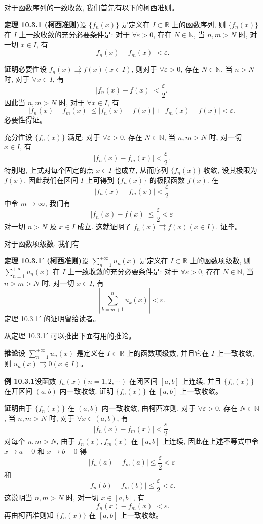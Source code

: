 \documentclass[UTF8,12pt,a4paper,fontset=fandol]{ctexart}
\begin{document}
对于函数序列的一致收敛, 我们首先有以下的柯西准则。

\noindent\textbf{定理 10.3.1 (柯西准则)}\quad 设 $\{f_n(x)\}$ 是定义在 $I\subset\mathbb R$ 上的函数序列, 则 $\{f_n(x)\}$ 在 $I$ 上一致收敛的充分必要条件是: 对于 $\forall\varepsilon>0$, 存在 $N\in\mathbb N$, 当 $n,m>N$ 时, 对一切 $x\in I$, 有
\[
  |f_n(x)-f_m(x)|<\varepsilon.
\]

\noindent\textbf{证明}\quad 必要性\quad 设 $f_n(x)\rightrightarrows f(x)(x\in I)$, 则对于 $\forall\varepsilon>0$, 存在 $N\in\mathbb N$, 当 $n>N$ 时, 对于 $\forall x\in I$, 有
\[
  |f_n(x)-f(x)|<\frac\varepsilon2.
\]
因此当 $n,m>N$ 时, 对于 $\forall x\in I$, 有
\[
  |f_n(x)-f_m(x)|\leq |f_n(x)-f(x)|+|f_m(x)-f(x)|<\varepsilon.
\]
必要性得证。

充分性\quad 设 $\{f_n(x)\}$ 满足: 对于 $\forall\varepsilon>0$, 存在 $N\in\mathbb N$, 当 $n,m>N$ 时, 对一切 $x\in I$, 有
\[
  |f_n(x)-f_m(x)|<\frac\varepsilon2.
\]
特别地, 上式对每个固定的点 $x\in I$ 也成立, 从而序列 $\{f_n(x)\}$ 收敛, 设其极限为 $f(x)$, 因此我们在区间 $I$ 上可得到 $\{f_n(x)\}$ 的极限函数 $f(x)$. 在
\[
  |f_n(x)-f_m(x)|<\frac\varepsilon2
\]
中令 $m\to\infty$, 我们有
\[
  |f_n(x)-f(x)|\leq\frac\varepsilon2<\varepsilon
\]
对一切 $n>N$ 及 $x\in I$ 成立. 这就证明了 $f_n(x)\rightrightarrows f(x)(x\in I)$. 证毕。

对于函数项级数, 我们有

\noindent\textbf{定理 10.3.1$'$ (柯西准则)}\quad 设 $\sum\limits_{n=1}^{+\infty}u_n(x)$ 是定义在 $I\subset\mathbb R$ 上的函数项级数, 则 $\sum\limits_{n=1}^{+\infty}u_n(x)$ 在 $I$ 上一致收敛的充分必要条件是: 对于 $\forall\varepsilon>0$, 存在 $N\in\mathbb N$, 当 $n>m>N$ 时, 对一切 $x\in I$, 有
\[
  \left|\sum_{k=m+1}^n u_k(x)\right|<\varepsilon.
\]
定理 10.3.1$'$ 的证明留给读者。

从定理 10.3.1$'$ 可以推出下面有用的推论。

\noindent\textbf{推论}\quad 设 $\sum\limits_{n=1}^{+\infty}u_n(x)$ 是定义在 $I\subset\mathbb R$ 上的函数项级数, 并且它在 $I$ 上一致收敛, 则 $u_n(x)\rightrightarrows0(x\in I)$。

\noindent\textbf{例 10.3.1}\quad 设函数 $f_n(x)(n=1,2,\cdots)$ 在闭区间 $[a,b]$ 上连续, 并且 $\{f_n(x)\}$ 在开区间 $(a,b)$ 内一致收敛. 证明 $\{f_n(x)\}$ 在 $[a,b]$ 上一致收敛。

\noindent\textbf{证明}\quad 由于 $\{f_n(x)\}$ 在 $(a,b)$ 内一致收敛, 由柯西准则, 对于 $\forall\varepsilon>0$, 存在 $N\in\mathbb N$, 当 $n,m>N$ 时, 对于 $\forall x\in(a,b)$, 有
\[
  |f_n(x)-f_m(x)|<\frac\varepsilon2.
\]
对每个 $n,m>N$, 由于 $f_n(x),f_m(x)$ 在 $[a,b]$ 上连续, 因此在上述不等式中令 $x\to a+0$ 和 $x\to b-0$ 得
\[
  |f_n(a)-f_m(a)|\leq\frac\varepsilon2<\varepsilon
\]
和
\[
  |f_n(b)-f_m(b)|\leq\frac\varepsilon2<\varepsilon.
\]
这说明当 $n,m>N$ 时, 对一切 $x\in[a,b]$, 有
\[
  |f_n(x)-f_m(x)|<\varepsilon.
\]
再由柯西准则知 $\{f_n(x)\}$ 在 $[a,b]$ 上一致收敛。
\end{document}
